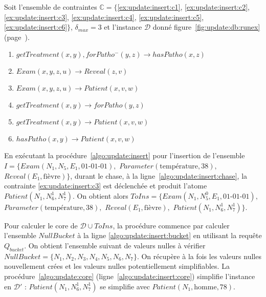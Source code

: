 \begin{example}
    Soit l'ensemble de contraintes $\mathbb{C} = \{$\ref{ex:update:insert:c1}, \ref{ex:update:insert:c2}, \ref{ex:update:insert:c3}, \ref{ex:update:insert:c4}, \ref{ex:update:insert:c5}, \ref{ex:update:insert:c6}$\}$, $\delta_{max} = 3$ et l'instance $\mathcal{D}$ donné figure~\ref{fig:update:db:runex} (page~\pageref{fig:update:db:runex}).

    \begin{enumerate}[label=\textbf{$c_\arabic*$ :},ref=$c_\arabic*$]
        \item $getTreatment(x, y), forPatho^-(y, z) \to hasPatho(x, z)$ \label{ex:update:insert:c1}
        \item $Exam(x, y, z, u) \to Reveal(z, v)$ \label{ex:update:insert:c2}
        \item $Exam(x, y, z, u) \to Patient(x, v, w)$ \label{ex:update:insert:c3}
        \item $getTreatment(x, y) \to forPatho(y, z)$ \label{ex:update:insert:c4}
        \item $getTreatment(x, y) \to Patient(x, v, w)$ \label{ex:update:insert:c5}
        \item $hasPatho(x, y) \to Patient(x, v, w)$ \label{ex:update:insert:c6}
    \end{enumerate}

    En exécutant la procédure~\ref{algo:update:insert} pour l'insertion de l'ensemble $I = \{ Exam(N_1, N_5, E_1, \text{01-01-01}),$ $Parameter(\text{température}, 38),$ $Reveal(E_1, \text{fièvre}) \}$, durant le \gls{chase}, à la ligne~\ref{algo:update:insert:chase}, la contrainte \ref{ex:update:insert:c3} est déclenchée et produit l'atome $Patient(N_1, N_6^1, N_7^1)$.
    On obtient alors $ToIns = \{ Exam(N_1, N_5^0, E_1, \text{01-01-01}),$ $Parameter(\text{température}, 38),$ $Reveal(E_1, \text{fièvre}),$ $Patient(N_1, N_6^1, N_7^1) \}$.

    Pour calculer le \gls{core} de $\mathcal{D} \cup ToIns$, la procédure commence par calculer l'ensemble $NullBucket$ à la ligne \ref{algo:update:insert:bucket} en utilisant la requête $Q_{bucket}$.
    On obtient l'ensemble suivant de valeurs nulles à vérifier $NullBucket = \{N_1, N_2, N_3, N_4, N_5, N_6, N_7\}$.
    On récupère à la fois les valeurs nulles nouvellement crées et les valeurs nulles potentiellement simplifiables.
    La procédure~\ref{algo:update:core} (ligne~\ref{algo:update:insert:core}) simplifie l'instance en $\mathcal{D}'$ : $Patient(N_1, N_6^1, N_7^1)$ se simplifie avec $Patient(N_1, \text{homme}, 78)$.


\end{example}
